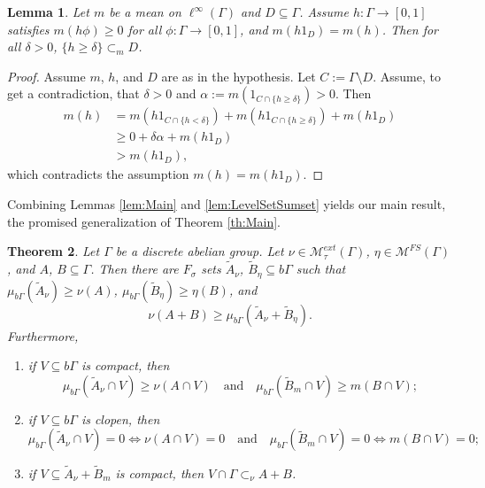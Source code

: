 \documentclass[12pt]{amsart} \usepackage{amsmath,centernot,amssymb,leftindex}
\newtheorem{theorem}{Theorem}
\newtheorem{lemma}[theorem]{Lemma}
\numberwithin{theorem}{section}
\numberwithin{equation}{section}
\theoremstyle{definition}
\begin{document}
 \begin{lemma}\label{lem:EssentialLevelContainment}
 	Let $m$ be a mean on $\ell^{\infty}(\Gamma)$ and $D\subseteq \Gamma$.  Assume $h:\Gamma \to [0,1]$ satisfies $m(h\phi)\geq 0$ for all $\phi:\Gamma\to[0,1]$, and $m(h1_{D})=m(h)$. Then for all $\delta>0$, $\{h\geq \delta\}\subset_{m} D$.
 \end{lemma}
 
 \begin{proof}
 	Assume $m$, $h$, and $D$ are as in the hypothesis. Let $C:=\Gamma \setminus D$. Assume, to get a contradiction, that $\delta>0$ and $\alpha:=m(1_{C\cap \{h\geq\delta\}})>0$.  Then 
 	\begin{align*}
 		m(h)&= m(h1_{C\cap \{h< \delta\}}) + m(h1_{C\cap \{h\geq \delta\}}) + m(h1_{D})\\ &\geq 0+\delta\alpha+m(h1_{D})\\
 		&>m(h1_{D}),
 	\end{align*} which contradicts the assumption $m(h)=m(h1_{D})$.  
 \end{proof}

 
 
 
 Combining Lemmas \ref{lem:Main} and \ref{lem:LevelSetSumset} yields our main result, the promised generalization of Theorem \ref{th:Main}.
	
	\begin{theorem}\label{th:MainGeneral}  Let $\Gamma$ be a discrete abelian group.  Let $\nu\in \mathcal M_{\tau}^{ext}(\Gamma)$, $\eta\in \mathcal M^{FS}(\Gamma)$, and $A$, $B\subseteq \Gamma$.  
	Then there are $F_{\sigma}$ sets $\tilde{A}_{\nu}$, $\tilde{B}_{\eta}\subseteq b\Gamma$  such that $\mu_{b\Gamma}(\tilde{A}_{\nu})\geq \nu(A)$, $\mu_{b\Gamma}(\tilde{B}_{\eta})\geq \eta(B)$, and
\begin{equation}\label{eq:MainMeasure}
		\nu(A+B)\geq \mu_{b\Gamma}(\tilde{A}_{\nu}+\tilde{B}_{\eta}).
\end{equation}
Furthermore,
\begin{enumerate}
	\item\label{item:recallAVBV} if $V\subseteq b\Gamma$ is compact, then 
	\[\mu_{b\Gamma}(\tilde{A}_{\nu}\cap V)\geq \nu(A\cap V) \quad \text{and} \quad \mu_{b\Gamma}(\tilde{B}_{m}\cap V)\geq m(B\cap V);\]
	
	\item\label{item:recallVbGammaClopen} if $V\subseteq b\Gamma$ is clopen, then
	\[\mu_{b\Gamma}(\tilde{A}_{\nu}\cap V)=0\iff \nu(A\cap V)=0 \quad \text{and} \quad \mu_{b\Gamma}(\tilde{B}_{m}\cap V)=0\iff m(B\cap V)=0;\]
	
	\item\label{item:recallVcapGamma}  if $V\subseteq \tilde{A}_{\nu}+\tilde{B}_{m}$ is compact, then $V\cap \Gamma \subset_{\nu} A+B$.
\end{enumerate}
\end{theorem}	
\end{document}
